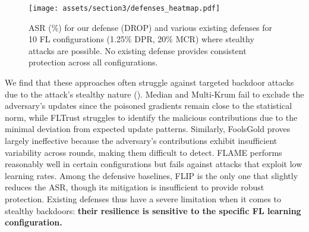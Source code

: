 

\begin{figure}[h]
    \texttt{[image: assets/section3/defenses\_heatmap.pdf]}
    \caption{ASR (\%) for our defense (DROP) and various existing defenses for 10 FL configurations (1.25\% DPR, 20\% MCR) where stealthy attacks are possible. No existing defense provides consistent protection across all configurations.}
    \label{fig:baselines_heatmap}
\end{figure}

We find that these approaches often struggle against targeted backdoor attacks due to the attack's stealthy nature (). Median and Multi-Krum fail to exclude the adversary’s updates since the poisoned gradients remain close to the statistical norm, while FLTrust struggles to identify the malicious contributions due to the minimal deviation from expected update patterns. Similarly, FoolsGold proves largely ineffective because the adversary’s contributions exhibit insufficient variability across rounds, making them difficult to detect. FLAME performs reasonably well in certain configurations but fails against attacks that exploit low learning rates. Among the defensive baselines, FLIP is the only one that slightly reduces the ASR, though its mitigation is insufficient to provide robust protection.
Existing defenses thus have a severe limitation when it comes to stealthy backdoors: \textbf{their resilience is sensitive to the specific FL learning configuration.}
